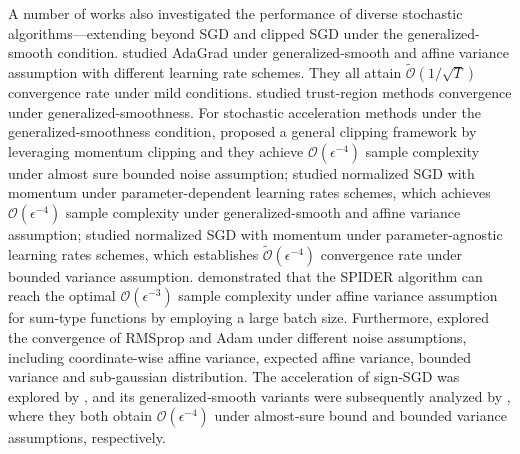 \documentclass[10pt]{article} %
\begin{document}
A number of works also investigated the performance of diverse stochastic algorithms—extending beyond SGD and clipped SGD under the generalized-smooth condition.
\citet{adagradnorm,faw2023relax, hongAdagrad} studied AdaGrad \citep{duchiAdagrad} under generalized-smooth and affine variance assumption with different learning rate schemes. They all attain $\mathcal{\tilde{O}}(1/\sqrt{T})$ convergence rate under mild conditions. \citet{trustgensmooth} studied trust-region methods convergence under generalized-smoothness.
For stochastic acceleration methods under the generalized-smoothness condition, \citet{genralclip} proposed a general clipping framework by leveraging momentum clipping and they achieve $\mathcal{O}(\epsilon^{-4})$ sample complexity under almost sure bounded noise assumption; \citet{jin2021nonconvex} studied normalized SGD with momentum under parameter-dependent learning rates schemes, which achieves $\mathcal{O}(\epsilon^{-4})$ sample complexity under generalized-smooth and affine variance assumption; \citet{tuningensmooth} studied normalized SGD with momentum \citep{NSGDm} under parameter-agnostic learning rates schemes, which establishes $\tilde{\mathcal{O}}({\epsilon^{-4}})$ convergence rate under bounded variance assumption.
\citet{pmlr-v202-chen23ar,reisizadeh2023variancereducedclippingnonconvexoptimization} demonstrated that the SPIDER algorithm \citep{fang2018spidernearoptimalnonconvexoptimization} can reach the optimal $\mathcal{O}(\epsilon^{-3})$ sample complexity under affine variance assumption for sum-type functions by employing a large batch size. Furthermore, \citet{qigensmoothadam, huishuaigensmoothadam,huishuaiadam2,adamconvg} explored the convergence of RMSprop \citep{rmsprop} and Adam \citep{kingma2014adam} under different noise assumptions, including coordinate-wise affine variance, expected affine variance, bounded variance and sub-gaussian distribution. The acceleration of sign‑SGD was explored by \citet{signSGDacc,signSGDimprov}, and its generalized‑smooth variants were subsequently analyzed by \citet{mingruisignsgdgs,generalsmoothsignSGD}, where they both obtain $\mathcal{O}(\epsilon^{-4})$ under almost‑sure bound and bounded variance assumptions, respectively.
\end{document}
